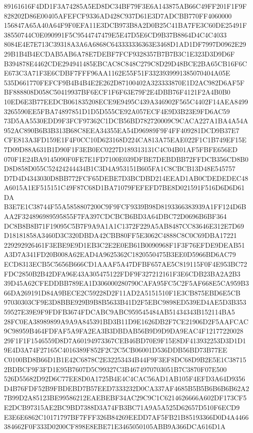 \documentclass[UTF8,fontset=fandol,zihao=-4,a4paper]{ctexart}
\begin{document}
{{89161616F4DD1F3A74285A5ED8DC34BF79F3E6A143875AB66C49FF201F1F9F828202D86E00405AFEFCF9336AD428C937D61E3D7ADCBB770FF4060000
156847A65A40A64F9F0EFA11E3DCB973B8A2D0B25C41BA7FE3C60DE25491F38550744C0E090991F5C9544747479E5E47D5E6CD9B37B8864D4C4C4033
8084E4E7E713C39318A3A6A6868C643333336363E3468D1AD1DF7997D0962E2929B1B4B4ECDAB5AB6A78E7DEBF7FCF9328357B7B7B3C1E323D3D9D6F
B394878E4462CDE294941485EBCAC8C848C279C8D29D48BCE2BA65CB16F6CE673C3A71F3E6CDBF7FFF96AA1162E55F51F3323939991385070404A05E
535D661770FEFCF9B4B4B4E2E262D87100402A323333870E1D2AC982D6AF5FBF888808D058C50419937BF6ECF1F6F63E79F2E4DBB76F4121F2A4B0B0
10ED6E3B77EEDCB061835208ECE9E9495C439A346902F565C4402F14AEA84993265590EE5FBA74897851D1D5D555CE92A057ECF4E9D3B23E9FD6AC59
73D5AA5530EDD9F3FCF97362C1DCB56BD782720009C9CACA227A1BA4A54A952AC890B6B3B313B68C8EEA34355EA54D96989F9F4FF409281DCD9B37E7
CFE813A3FD159E1F4F0CC10D623168D224CA813A75EAE022F1C1B749EF15E7D09D88A631B1D90F1F3EB0EC0227D189313131C4C04B01AF5FBFE656ED
070F1E24BA9145090F0FE7E1FD7100E039DFBE7DEBDBB72FFDCB356CD8B0D8D858D055C52424244434B1C3D4A953151B605FA1C8CBCB13D48E545757
D7D4D4343030D8BB772FCF65DEBE7D3BCDBD214EEAD1AB0CDEDEDEC48A6015A1EF515151C49F87C68D1BA71079FEFEFD7BE8D021591F516D6D6D61DA
B3E7E1C38744F55A5858807200C9F9FCF9339B98D8193366383939A1FF124D6BAA2F324896989595855F7FA397CDCBCB6BD3A64DBC72D0696B6BF364
DC8B8B8B71F19095C5B7F9A9A1A1C1372F229A5AB8487CC83646E312E7D69D18181858A3460D3C320DBDA42CBB80FF5E3062C4888C8C0C69DBA17221
229292926461F3EBE9E9D1EB3C2E2E0EB61B0090968F1F3F76EFDE9DEAB51A3D7A341FD20B008A62EAD4A9625362C1820550475B3EE0D5966BD6AC79
ECD8313ECB5C5656B666CD1AAAF5A47DFBF657AE5C819115F0F4E953BC72FDC2850B2B42DFA96E43A305475122FDF9F327212161F3E6CDB23BA2A2B3
39D45A62CFEDDBB789EA1D306000280790CAFA95FC5C2F5AF668E5CA959B366DA269191D84A9BECE2C59228D2F11AD2A5151510F1E3CB875EBD6E5CB
97030303CF9E3D8BBE929B9B8B5633B41D2F5EBC9898ED539ED4AE5D3B35359527E39E9F9FDFB3674FDCABC9ABC959545484AB51434343B152114BA5
28FC0EA38989899A9A9A845391BD3B11D9E1626DB2F7CE21906D2F5AAFCAC9C98959B464FDFAF5A9FA2EA3B3DBDAB56B9D9D9DA9EAC4F12177220028
29F1F1F1546559D8D7A60194973367CEB46BD70E9F15E8DF413932253D3D1D19E4D3A74F27165C4016389F852F2C2C5CB06001D536DDB56BD73B77EE
C0100BD8B66D1B1E42C6878C2E32253434B44F9F3EF8DC68D9B2E5E1C387152BDBCF9F3FD1E95B7607D5C99327C3B4674970703051B7C3870F07E500
526D55682D92D6C77EE8D0A1725B4E4C4CAC56AD1AB105F4EFD3A64D9356D4B76FDF52B9FBDEBD7B57EED7333232D0CA337AF4685B5B5B6B6B6B62A2
7B99D2A85123BE99586212EAEBEBF34AC29C9C1C6214626666A602DF173CF5E2DCB97315AE2BC9BD7388D3A74FB3BC71A9A5A525D62657D510F6ECD9
E3E6E6862C10171797BF7FFF326B84269EEDD7AF5FB21B85193366D0D4A4466384662F0F333D0200CF898E8EBE71E3465050105ABB9A366DCA616D1A
}}
\end{document}
